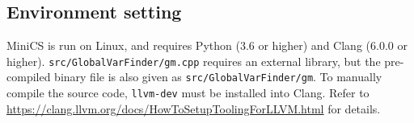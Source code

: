 \subsection{Environment setting}

MiniCS is run on Linux, and requires Python (3.6 or higher) and Clang (6.0.0 or higher). \verb|src/GlobalVarFinder/gm.cpp| requires an external library, but the pre-compiled binary file is also given as \verb|src/GlobalVarFinder/gm|. To manually compile the source code, \verb|llvm-dev| must be installed into Clang. Refer to \url{https://clang.llvm.org/docs/HowToSetupToolingForLLVM.html} for details.
